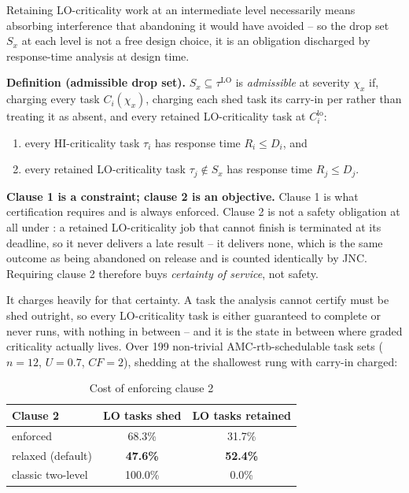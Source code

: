 \documentclass{article}
\begin{document}
Retaining LO-criticality work at an intermediate level necessarily means
absorbing interference that abandoning it would have avoided -- so the drop
set $S_x$ at each level is not a free design choice, it is an obligation
discharged by response-time analysis at design time.

\textbf{Definition (admissible drop set).} $S_x \subseteq \tau^{\mathrm{LO}}$
is \emph{admissible} at severity $\chi_x$ if, charging every task
$C_i(\chi_x)$, charging each shed task its carry-in per
 rather than treating it as absent, and every retained
LO-criticality task at $C_i^{\mathrm{lo}}$:
\begin{enumerate}
\item every HI-criticality task $\tau_i$ has response time $R_i \leq D_i$, and
\item every retained LO-criticality task $\tau_j \notin S_x$ has response time
  $R_j \leq D_j$.
\end{enumerate}

\textbf{Clause 1 is a constraint; clause 2 is an objective.} Clause 1 is what
certification requires and is always enforced. Clause 2 is not a safety
obligation at all under : a retained LO-criticality job
that cannot finish is terminated at its deadline, so it never delivers a late
result -- it delivers none, which is the same outcome as being abandoned on
release and is counted identically by JNC. Requiring clause 2 therefore buys
\emph{certainty of service}, not safety.

It charges heavily for that certainty. A task the analysis cannot certify must
be shed outright, so every LO-criticality task is either guaranteed to complete
or never runs, with nothing in between -- and it is the state in between where
graded criticality actually lives. Over 199 non-trivial AMC-rtb-schedulable
task sets ($n=12$, $U=0.7$, $CF=2$), shedding at the shallowest rung with
carry-in charged:

\begin{table}[h]
\centering
\caption{Cost of enforcing clause 2}
\label{tab:clause2}
\begin{tabular}{lcc}
\toprule
Clause 2 & LO tasks shed & LO tasks retained \\
\midrule
enforced          & 68.3\%  & 31.7\% \\
relaxed (default) & \textbf{47.6\%}  & \textbf{52.4\%} \\
\midrule
classic two-level & 100.0\% & 0.0\% \\
\bottomrule
\end{tabular}
\end{table}
\end{document}
